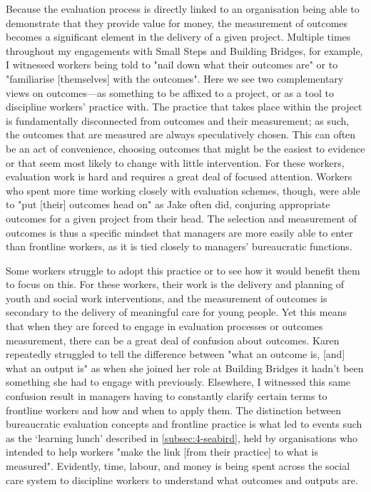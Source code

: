 Because the evaluation process is directly linked to an organisation being able to demonstrate that they provide value for money, the measurement of outcomes becomes a significant element in the delivery of a given project. Multiple times throughout my engagements with Small Steps and Building Bridges, for example, I witnessed workers being told to "nail down what their outcomes are" or to "familiarise [themselves] with the outcomes". Here we see two complementary views on outcomes—as something to be affixed to a project, or as a tool to discipline workers' practice with. The practice that takes place within the project is fundamentally disconnected from outcomes and their measurement; as such, the outcomes that are measured are always speculatively chosen. This can often be an act of convenience, choosing outcomes that might be the easiest to evidence or that seem most likely to change with little intervention. For these workers, evaluation work is hard and requires a great deal of focused attention. Workers who spent more time working closely with evaluation schemes, though, were able to "put [their] outcomes head on" as Jake often did, conjuring appropriate outcomes for a given project from their head. The selection and measurement of outcomes is thus a specific mindset that managers are more easily able to enter than frontline workers, as it is tied closely to managers' bureaucratic functions.%

Some workers struggle to adopt this practice or to see how it would benefit them to focus on this. For these workers,  their work is the delivery and planning of youth and social work interventions, and the measurement of outcomes is secondary to the delivery of meaningful care for young people. Yet this means that when they are forced to engage in evaluation processes or outcomes measurement, there can be a great deal of confusion about outcomes. Karen repeatedly struggled to tell the difference between "what an outcome is, [and] what an output is" as when she joined her role at Building Bridges it hadn't been something she had to engage with previously. Elsewhere, I witnessed this same confusion result in managers having to constantly clarify certain terms to frontline workers and how and when to apply them. The distinction between bureaucratic evaluation concepts and frontline practice is what led to events such as the `learning lunch' described in \ref{subsec:4-seabird}, held by organisations who intended to help workers "make the link [from their practice] to what is measured". Evidently, time, labour, and money is being spent across the social care system to discipline workers to understand what outcomes and outputs are.

